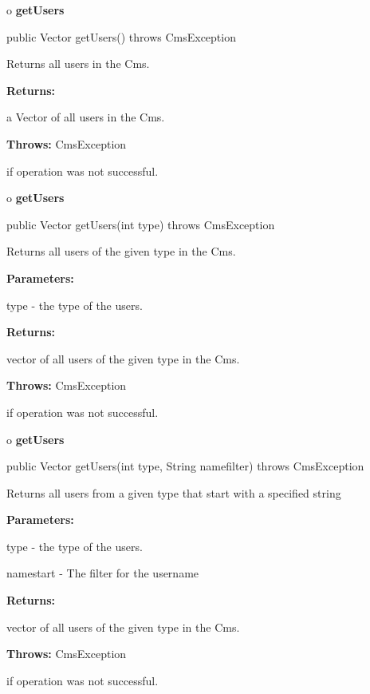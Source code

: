 o {\bf getUsers}

\begin{PRE}
 public Vector getUsers() throws CmsException
\end{PRE}

\begin{description}
\htmlDD Returns all users in the Cms.

\begin{description}
\item {\bf Returns:}

a Vector of all users in the Cms.
\item {\bf Throws:} CmsException

if operation was not successful.
\end{description}

\end{description}

o {\bf getUsers}

\begin{PRE}
 public Vector getUsers(int type) throws CmsException
\end{PRE}

\begin{description}
\htmlDD Returns all users of the given type in the Cms.

\begin{description}
\item {\bf Parameters:}

type - the type of the users.
\item {\bf Returns:}

vector of all users of the given type in the Cms.
\item {\bf Throws:} CmsException

if operation was not successful.
\end{description}

\end{description}

o {\bf getUsers}

\begin{PRE}
 public Vector getUsers(int type,
                        String namefilter) throws CmsException
\end{PRE}

\begin{description}
\htmlDD Returns all users from a given type that start with a specified string


\begin{description}
\item {\bf Parameters:}

type - the type of the users.

namestart - The filter for the username
\item {\bf Returns:}

vector of all users of the given type in the Cms.
\item {\bf Throws:} CmsException

if operation was not successful.
\end{description}

\end{description}

